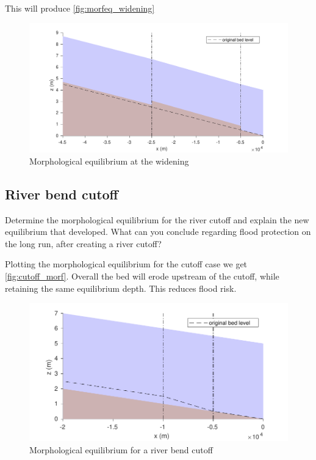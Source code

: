 \documentclass[a4paper]{article}
\begin{document}
This will produce \autoref{fig:morfeq_widening}
\begin{figure}[ht]
  \centering
  \includegraphics[width=\linewidth]{matlab/morfeq_widening.pdf}
  \caption{Morphological equilibrium at the widening}
  \label{fig:morfeq_widening}
\end{figure}

\subsection{River bend cutoff}

\begin{exercise}
  Determine the morphological equilibrium for the river cutoff and explain the new equilibrium that developed. What can you conclude regarding flood protection on the long run, after creating a river cutoff?
\end{exercise}
\begin{solution}
  Plotting the morphological equilibrium for the cutoff case we get \autoref{fig:cutoff_morf}. Overall the bed will erode upstream of the cutoff, while retaining the same equilibrium depth. This reduces flood risk.
\begin{figure}
    \centering
    \includegraphics[width=\linewidth]{matlab/cutoff_morfeq.pdf}
    \caption{Morphological equilibrium for a river bend cutoff}
    \label{fig:cutoff_morfeq}
\end{figure}

\end{solution}
\end{document}
